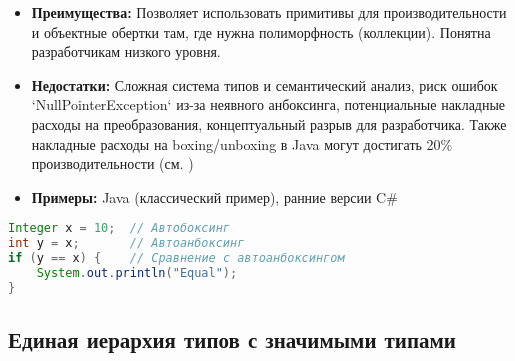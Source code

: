 \begin{itemize}[label={--}]
    \item \textbf{Преимущества:}
    Позволяет использовать примитивы для производительности и объектные обертки там, где нужна полиморфность (коллекции). Понятна разработчикам низкого уровня.

    \item \textbf{Недостатки:} Сложная система типов и семантический анализ, риск ошибок `NullPointerException` из-за неявного анбоксинга, потенциальные накладные расходы на преобразования, концептуальный разрыв для разработчика. Также накладные расходы на boxing/unboxing в Java могут достигать 20\% производительности (см. \cite{chen2019})

    \item \textbf{Примеры:} Java (классический пример), ранние версии C\#
\end{itemize}

\newpage

\begin{lstlisting}[language=java,title=Пример в Java]
Integer x = 10;  // Автобоксинг
int y = x;       // Автоанбоксинг
if (y == x) {    // Сравнение с автоанбоксингом
    System.out.println("Equal");
}
\end{lstlisting}

\subsection{Единая иерархия типов с значимыми типами}

